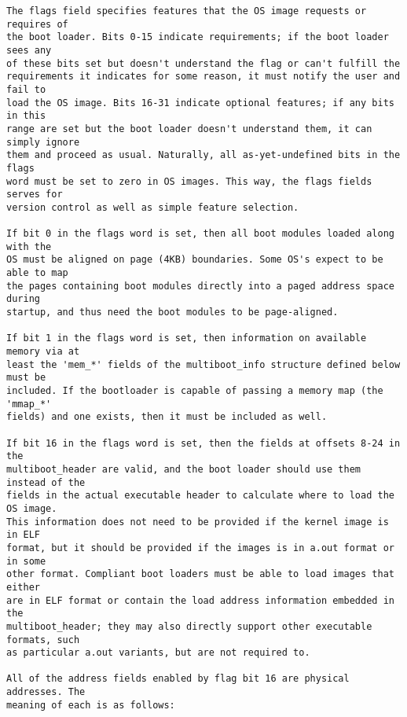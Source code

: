 \begin{verbatim}
The flags field specifies features that the OS image requests or requires of
the boot loader. Bits 0-15 indicate requirements; if the boot loader sees any
of these bits set but doesn't understand the flag or can't fulfill the
requirements it indicates for some reason, it must notify the user and fail to
load the OS image. Bits 16-31 indicate optional features; if any bits in this
range are set but the boot loader doesn't understand them, it can simply ignore
them and proceed as usual. Naturally, all as-yet-undefined bits in the flags
word must be set to zero in OS images. This way, the flags fields serves for
version control as well as simple feature selection.

If bit 0 in the flags word is set, then all boot modules loaded along with the
OS must be aligned on page (4KB) boundaries. Some OS's expect to be able to map
the pages containing boot modules directly into a paged address space during
startup, and thus need the boot modules to be page-aligned.

If bit 1 in the flags word is set, then information on available memory via at
least the 'mem_*' fields of the multiboot_info structure defined below must be
included. If the bootloader is capable of passing a memory map (the 'mmap_*'
fields) and one exists, then it must be included as well.

If bit 16 in the flags word is set, then the fields at offsets 8-24 in the
multiboot_header are valid, and the boot loader should use them instead of the
fields in the actual executable header to calculate where to load the OS image.
This information does not need to be provided if the kernel image is in ELF
format, but it should be provided if the images is in a.out format or in some
other format. Compliant boot loaders must be able to load images that either
are in ELF format or contain the load address information embedded in the
multiboot_header; they may also directly support other executable formats, such
as particular a.out variants, but are not required to.

All of the address fields enabled by flag bit 16 are physical addresses. The
meaning of each is as follows:


\end{verbatim}
